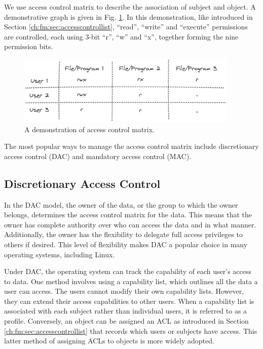 We use access control matrix to describe the association of subject and object. A demonstrative graph is given in Fig. \ref{ch:ossec:fig:acmatrix}. In this demonstration, like introduced in Section \ref{ch:fm:sec:accesscontrollist}, ``read'', ``write'' and ``execute'' permissions are controlled, each using $3$-bit ``r'', ``w'' and ``x'', together forming the nine permission bits.
\begin{figure}[htbp]
	\centering
	\includegraphics[width=300pt]{chapters/part-4/figures/acmatrix.png}
	\caption{A demonstration of access control matrix.} \label{ch:ossec:fig:acmatrix}
\end{figure}

The most popular ways to manage the access control matrix include discretionary access control (DAC) and mandatory access control (MAC).

\subsection{Discretionary Access Control}

In the DAC model, the owner of the data, or the group to which the owner belongs, determines the access control matrix for the data. This means that the owner has complete authority over who can access the data and in what manner. Additionally, the owner has the flexibility to delegate full access privileges to others if desired. This level of flexibility makes DAC a popular choice in many operating systems, including Linux.

Under DAC, the operating system can track the capability of each user's access to data. One method involves using a capability list, which outlines all the data a user can access. The users cannot modify their own capability lists. However, they can extend their access capabilities to other users. When a capability list is associated with each subject rather than individual users, it is referred to as a profile. Conversely, an object can be assigned an ACL as introduced in Section \ref{ch:fm:sec:accesscontrollist} that records which users or subjects have access. This latter method of assigning ACLs to objects is more widely adopted.

